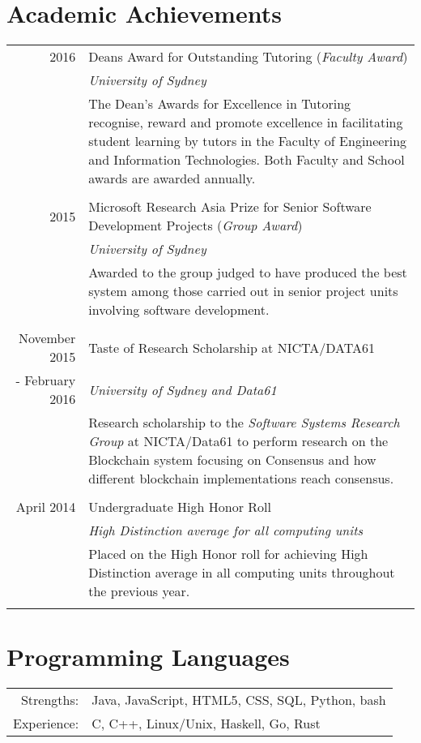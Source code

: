 \documentclass[10pt]{article}
\begin{document}
\section{Academic Achievements}
\begin{tabular}{r p{11cm}}
	2016 & Deans Award for Outstanding Tutoring (\emph{Faculty Award}) \\ & \emph{University of Sydney} \\ & \footnotesize{The Dean's Awards for Excellence in Tutoring recognise, reward and promote excellence in facilitating student learning by tutors in the Faculty of Engineering and Information Technologies. Both Faculty and School awards are awarded annually.}\\\multicolumn{2}{c}{}\\
2015 & Microsoft Research Asia Prize for Senior Software Development Projects (\emph{Group Award}) \\  & \emph{University of Sydney}\\ & \footnotesize{Awarded to the group judged to have produced the best system among those carried out in senior project units involving software development.}\\\multicolumn{2}{c}{}\\

November 2015 &Taste of Research Scholarship at \textsc{NICTA/DATA61} \\ - February 2016 & \emph{University of Sydney and Data61}\\&\footnotesize{Research scholarship to the \emph{Software Systems Research Group} at NICTA/Data61 to perform research on the Blockchain system focusing on Consensus and how different blockchain implementations reach consensus.}\\\multicolumn{2}{c}{} \\

April 2014 & Undergraduate High Honor Roll \\ & \emph{High Distinction average for all computing units}\\&\footnotesize{Placed on the High Honor roll for achieving High Distinction average in all computing units throughout the previous year.}\\\multicolumn{2}{c}{} \\
\end{tabular}

\section{Programming Languages}
\begin{tabular}{rl}
Strengths: & Java, JavaScript, HTML5, CSS, SQL, Python, bash\\
Experience: & C, C++, Linux/Unix, Haskell, Go, Rust
\end{tabular}
\end{document}
